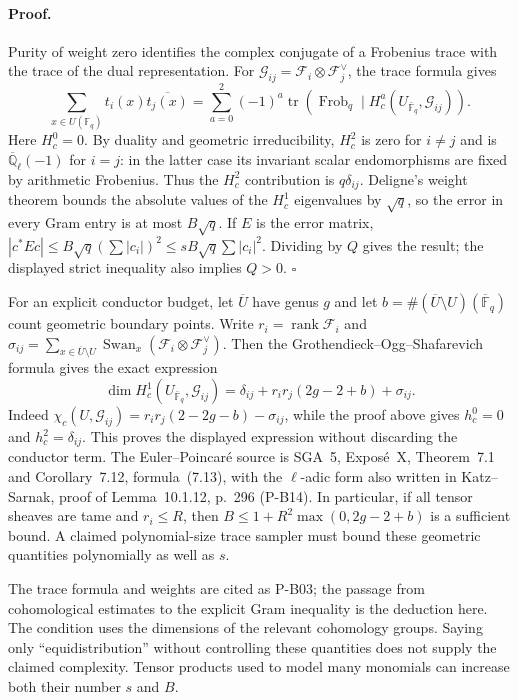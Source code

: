 \documentclass[11pt,a4paper]{article}
\theoremstyle{definition}\newtheorem{definition}{Definition}
\begin{document}
\paragraph{Proof.}
Purity of weight zero identifies the complex conjugate of a Frobenius trace with the trace of the dual representation. For $\mathcal G_{ij}=\mathcal F_i\otimes\mathcal F_j^\vee$, the trace formula gives
\[
 \sum_{x\in U(\mathbb F_q)}t_i(x)\overline{t_j(x)}
 =\sum_{a=0}^2(-1)^a\operatorname{tr}(\operatorname{Frob}_q\mid H_c^a(U_{\bar{\mathbb F}_q},\mathcal G_{ij})).
\]
Here $H_c^0=0$. By duality and geometric irreducibility, $H_c^2$ is zero for $i\ne j$ and is $\overline{\mathbb Q}_\ell(-1)$ for $i=j$: in the latter case its invariant scalar endomorphisms are fixed by arithmetic Frobenius. Thus the $H_c^2$ contribution is $q\delta_{ij}$. Deligne's weight theorem bounds the absolute values of the $H_c^1$ eigenvalues by $\sqrt q$, so the error in every Gram entry is at most $B\sqrt q$. If $E$ is the error matrix, $|c^*Ec|\le B\sqrt q(\sum|c_i|)^2\le sB\sqrt q\sum|c_i|^2$. Dividing by $Q$ gives the result; the displayed strict inequality also implies $Q>0$. $\square$

For an explicit conductor budget, let $\overline U$ have genus $g$ and let $b=\#(\overline U\setminus U)(\overline{\mathbb F}_q)$ count geometric boundary points. Write $r_i=\operatorname{rank}\mathcal F_i$ and $\sigma_{ij}=\sum_{x\in\overline U\setminus U}\operatorname{Swan}_x(\mathcal F_i\otimes\mathcal F_j^\vee)$. Then the Grothendieck--Ogg--Shafarevich formula gives the exact expression
\[
 \dim H_c^1(U_{\bar{\mathbb F}_q},\mathcal G_{ij})
 =\delta_{ij}+r_ir_j(2g-2+b)+\sigma_{ij}.
\]
Indeed $\chi_c(U,\mathcal G_{ij})=r_ir_j(2-2g-b)-\sigma_{ij}$, while the proof above gives $h_c^0=0$ and $h_c^2=\delta_{ij}$. This proves the displayed expression without discarding the conductor term. The Euler--Poincar\'e source is SGA~5, Expos\'e~X, Theorem~7.1 and Corollary~7.12, formula~(7.13), with the $\ell$-adic form also written in Katz--Sarnak, proof of Lemma~10.1.12, p.~296 (P-B14). In particular, if all tensor sheaves are tame and $r_i\le R$, then $B\le1+R^2\max(0,2g-2+b)$ is a sufficient bound. A claimed polynomial-size trace sampler must bound these geometric quantities polynomially as well as $s$.

The trace formula and weights are cited as P-B03; the passage from cohomological estimates to the explicit Gram inequality is the deduction here. The condition uses the dimensions of the relevant cohomology groups. Saying only ``equidistribution'' without controlling these quantities does not supply the claimed complexity. Tensor products used to model many monomials can increase both their number $s$ and $B$.
\end{document}
